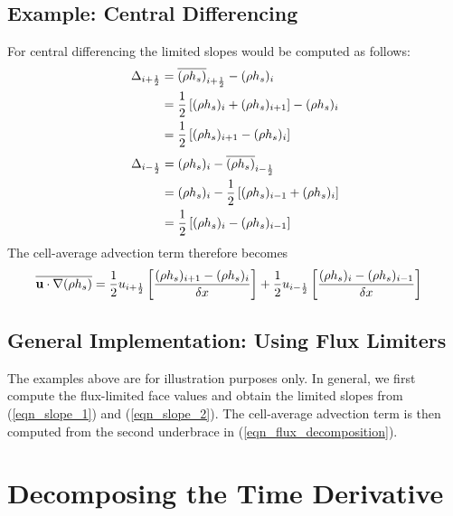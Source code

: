 \subsection*{Example: Central Differencing}
For central differencing the limited slopes would be computed as follows:
\begin{align}
\Delta_{i+\mbox{\tiny $\frac{1}{2}$}} &= \overline{(\rho h_s)}_{i+\mbox{\tiny $\frac{1}{2}$}} - (\rho h_s)_i \notag\\
&= \frac{1}{2}\left[(\rho h_s)_i + (\rho h_s)_{i+1}\right] - (\rho h_s)_i \notag\\
&= \frac{1}{2}\left[(\rho h_s)_{i+1} - (\rho h_s)_i\right]
\end{align}
\begin{align}
\Delta_{i-\mbox{\tiny $\frac{1}{2}$}} &= (\rho h_s)_i - \overline{(\rho h_s)}_{i-\mbox{\tiny $\frac{1}{2}$}} \notag\\
&= (\rho h_s)_i - \frac{1}{2}\left[(\rho h_s)_{i-1} + (\rho h_s)_i\right] \notag\\
&= \frac{1}{2}\left[ (\rho h_s)_i - (\rho h_s)_{i-1} \right]
\end{align}
The cell-average advection term therefore becomes
\begin{align}
\overline{\mathbf{u}\cdot\nabla(\rho h_s)} &= \frac{1}{2}  u_{i+\mbox{\tiny $\frac{1}{2}$}} \left[ \frac{(\rho h_s)_{i+1} - (\rho h_s)_i}{\delta x} \right] + \frac{1}{2} u_{i-\mbox{\tiny $\frac{1}{2}$}} \left[ \frac{(\rho h_s)_i - (\rho h_s)_{i-1}}{\delta x} \right]
\end{align}

\subsection*{General Implementation: Using Flux Limiters}
The examples above are for illustration purposes only.  In general, we first compute the flux-limited face values and obtain the limited slopes from (\ref{eqn_slope_1}) and (\ref{eqn_slope_2}).  The cell-average advection term is then computed from the second underbrace in (\ref{eqn_flux_decomposition}).


\section{Decomposing the Time Derivative}
\label{app_time_derivative}

